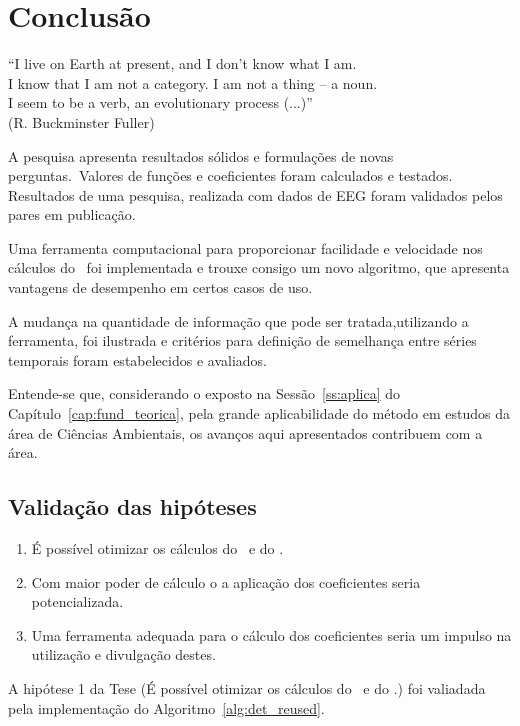 \chapter{Conclusão}
\label{cap:coclusion}

\begin{flushright}
    ``I live on Earth at present, and I don’t know what I am. \\
    I know that I am not a category. I am not a thing -- a noun.\\ 
    I seem to be a verb, an evolutionary process (...)''\\[10px]
    (R. Buckminster Fuller)
    \end{flushright}

A pesquisa apresenta resultados sólidos e formulações de novas perguntas.~Valores de funções e coeficientes foram calculados e testados. Resultados de uma pesquisa, realizada com dados de EEG foram validados pelos pares em publicação.

Uma ferramenta computacional para proporcionar facilidade e velocidade nos cálculos do \dmc~foi implementada e trouxe consigo um novo algoritmo, que apresenta vantagens de desempenho em certos casos de uso.

A mudança na quantidade de informação que pode ser tratada,utilizando a ferramenta, foi ilustrada e critérios para definição de semelhança entre séries temporais foram estabelecidos e avaliados.

Entende-se que, considerando o exposto na Sessão~\ref{ss:aplica} do Capítulo~\ref{cap:fund_teorica}, pela grande aplicabilidade do método em estudos da área de Ciências Ambientais, os avanços aqui apresentados contribuem com a área.

\section{Validação das hipóteses}

\begin{enumerate}
    \item É possível otimizar os cálculos do \pdcca~e do \dmc.
    \item Com maior poder de cálculo o a aplicação dos coeficientes seria potencializada.
	\item Uma ferramenta adequada para o cálculo dos coeficientes seria um impulso na utilização e divulgação destes.
\end{enumerate}

A hipótese 1 da Tese (É possível otimizar os cálculos do \pdcca~e do \dmc.) foi valiadada pela implementação do Algoritmo~\ref{alg:det_reused}.

